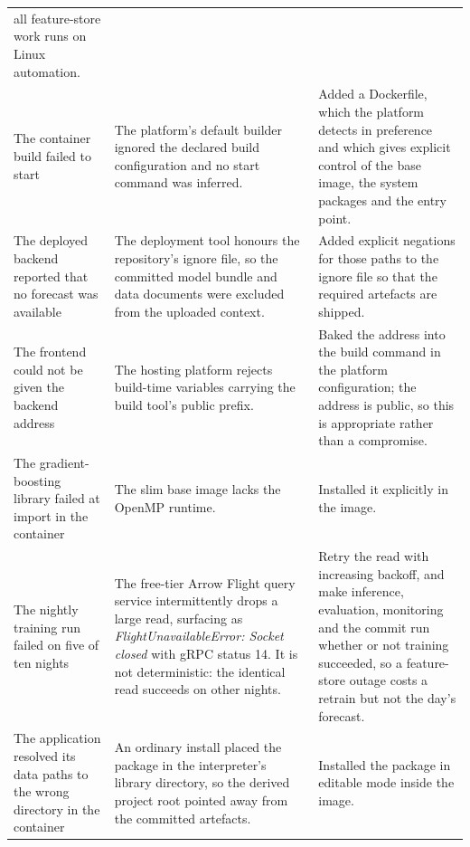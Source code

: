 \begin{xltabular}{\textwidth}{P{3.4cm} P{4.0cm} Y}
all feature-store work runs on Linux automation. \\
The container build failed to start & The platform's default builder ignored the
declared build configuration and no start command was inferred. & Added a
Dockerfile, which the platform detects in preference and which gives explicit
control of the base image, the system packages and the entry point. \\
The deployed backend reported that no forecast was available & The deployment
tool honours the repository's ignore file, so the committed model bundle and data
documents were excluded from the uploaded context. & Added explicit negations for
those paths to the ignore file so that the required artefacts are shipped. \\
The frontend could not be given the backend address & The hosting platform rejects
build-time variables carrying the build tool's public prefix. & Baked the address
into the build command in the platform configuration; the address is public, so
this is appropriate rather than a compromise. \\
The gradient-boosting library failed at import in the container & The slim base
image lacks the OpenMP runtime. & Installed it explicitly in the image. \\
The nightly training run failed on five of ten nights & The free-tier Arrow
Flight query service intermittently drops a large read, surfacing as
\emph{FlightUnavailableError: Socket closed} with gRPC status 14. It is not
deterministic: the identical read succeeds on other nights. & Retry the read with
increasing backoff, and make inference, evaluation, monitoring and the commit run
whether or not training succeeded, so a feature-store outage costs a retrain but
not the day's forecast. \\
The application resolved its data paths to the wrong directory in the container &
An ordinary install placed the package in the interpreter's library directory, so
the derived project root pointed away from the committed artefacts. & Installed
the package in editable mode inside the image. \\
\end{xltabular}

